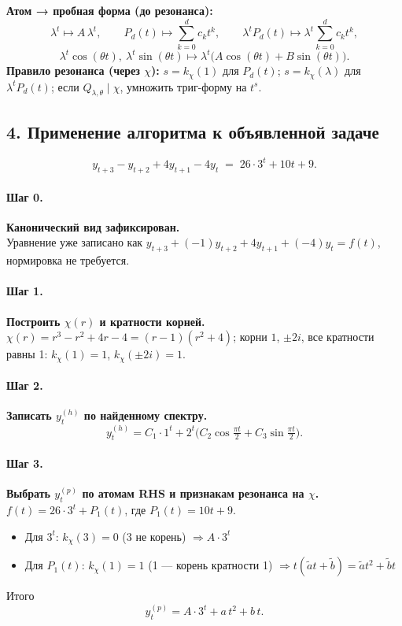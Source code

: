 \textbf{Атом → пробная форма (до резонанса):}
\[
\lambda^{t}\mapsto A\,\lambda^{t},\qquad
P_d(t)\mapsto \sum_{k=0}^d c_k t^k,\qquad
\lambda^{t}P_d(t)\mapsto \lambda^{t}\sum_{k=0}^d c_k t^k,
\]
\[
\lambda^{t}\cos(\theta t),\ \lambda^{t}\sin(\theta t)\mapsto \lambda^{t}\big(A\cos(\theta t)+B\sin(\theta t)\big).
\]
\textbf{Правило резонанса (через \(\chi\)):} \(s=k_\chi(1)\) для \(P_d(t)\); \(s=k_\chi(\lambda)\) для \(\lambda^{t}P_d(t)\); если \(Q_{\lambda,\theta}\mid\chi\), умножить триг-форму на \(t^{s}\).

\subsection*{4. Применение алгоритма к объявленной задаче}

\[
y_{t+3}-y_{t+2}+4y_{t+1}-4y_{t} \;=\; 26\cdot 3^{t} + 10t + 9.
\]

\paragraph{Шаг 0.} \textbf{Канонический вид зафиксирован.}\\
Уравнение уже записано как \(y_{t+3}+(-1)y_{t+2}+4y_{t+1}+(-4)y_t=f(t)\), нормировка не требуется.

\paragraph{Шаг 1.} \textbf{Построить \(\chi(r)\) и кратности корней.}\\
\(\chi(r)=r^3-r^2+4r-4=(r-1)(r^2+4)\); корни \(1\), \(\pm 2i\), все кратности равны 1: \(k_\chi(1)=1\), \(k_\chi(\pm 2i)=1\).

\paragraph{Шаг 2.} \textbf{Записать \(y^{(h)}_t\) по найденному спектру.}\\
\[
y^{(h)}_t=C_1\cdot 1^{t}+2^{t}\Big(C_2\cos\tfrac{\pi t}{2}+C_3\sin\tfrac{\pi t}{2}\Big).
\]

\paragraph{Шаг 3.} \textbf{Выбрать \(y^{(p)}_t\) по атомам RHS и признакам резонанса на \(\chi\).}\\
\(f(t)=26\cdot 3^t + P_1(t)\), где \(P_1(t)=10t+9\). 
\begin{itemize}
\item Для \(3^t\): \(k_\chi(3)=0\) (3 не корень) \(\Rightarrow A\cdot 3^t\)
\item Для \(P_1(t)\): \(k_\chi(1)=1\) (1 — корень кратности 1) \(\Rightarrow t(\tilde a t+\tilde b)=\tilde a t^2+\tilde b t\)
\end{itemize}
Итого
\[
y^{(p)}_t=A\cdot 3^t + a\,t^2 + b\,t.
\]

